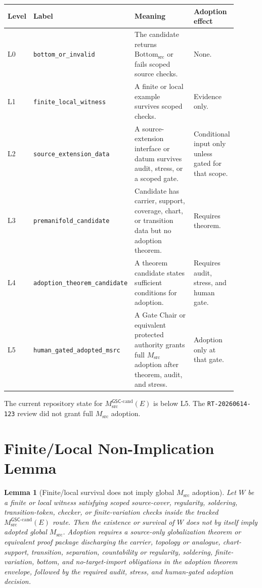 \documentclass[11pt]{article}
\newcommand{\GSC}{\mathsf{GSC}}
\newcommand{\Msrc}{M_{\mathrm{src}}}
\newcommand{\Mgsccand}{M_{\mathrm{src}}^{\GSC\mbox{-}\mathrm{cand}}}
\newcommand{\Bottomsrc}{\mathrm{Bottom}_{\mathrm{src}}}
\newtheorem{lemma}{Lemma}
\begin{document}
\begin{longtable}{|p{0.08\linewidth}|p{0.24\linewidth}|p{0.43\linewidth}|p{0.15\linewidth}|}
\hline
\textbf{Level} & \textbf{Label} & \textbf{Meaning} & \textbf{Adoption effect} \\
\hline
L0 & \texttt{bottom\_or\_invalid} & The candidate returns \(\Bottomsrc\) or fails scoped source checks. & None. \\
\hline
L1 & \texttt{finite\_local\_witness} & A finite or local example survives scoped checks. & Evidence only. \\
\hline
L2 & \texttt{source\_extension\_data} & A source-extension interface or datum survives audit, stress, or a scoped gate. & Conditional input only unless gated for that scope. \\
\hline
L3 & \texttt{premanifold\_candidate} & Candidate has carrier, support, coverage, chart, or transition data but no adoption theorem. & Requires theorem. \\
\hline
L4 & \texttt{adoption\_theorem\_candidate} & A theorem candidate states sufficient conditions for adoption. & Requires audit, stress, and human gate. \\
\hline
L5 & \texttt{human\_gated\_adopted\_msrc} & A Gate Chair or equivalent protected authority grants full \(\Msrc\) adoption after theorem, audit, and stress. & Adoption only at that gate. \\
\hline
\end{longtable}

The current repository state for \(\Mgsccand(E)\) is below L5. The
\texttt{RT-20260614-123} review did not grant full \(\Msrc\) adoption.

\section{Finite/Local Non-Implication Lemma}

\begin{lemma}[Finite/local survival does not imply global \(\Msrc\) adoption]
Let \(W\) be a finite or local witness satisfying scoped source-cover,
regularity, soldering, transition-token, checker, or finite-variation checks
inside the tracked \(\Mgsccand(E)\) route. Then the existence or survival of
\(W\) does not by itself imply adopted global \(\Msrc\). Adoption requires a
source-only globalization theorem or equivalent proof package discharging the
carrier, topology or analogue, chart-support, transition, separation,
countability or regularity, soldering, finite-variation, bottom, and
no-target-import obligations in the adoption theorem envelope, followed by the
required audit, stress, and human-gated adoption decision.
\end{lemma}
\end{document}
